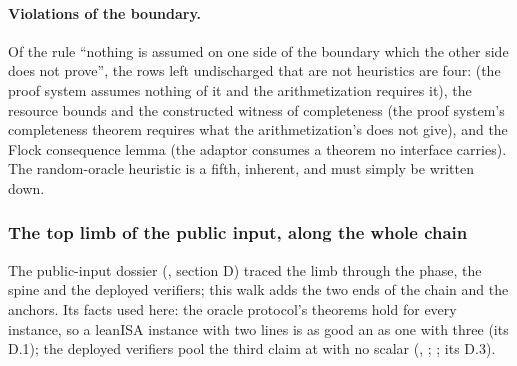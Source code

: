 \paragraph{Violations of the boundary.} Of the rule \enquote{nothing is assumed on one side of the
boundary which the other side does not prove}, the rows left undischarged that are not heuristics
are four:  (the proof system assumes nothing of it and the
arithmetization requires it), the resource bounds and the constructed witness of completeness
(the proof system's completeness theorem requires what the arithmetization's does not give), and
the Flock consequence lemma (the adaptor consumes a theorem no interface carries). The
random-oracle heuristic is a fifth, inherent, and must simply be written down.

\subsubsection{The top limb of the public input, along the whole chain}\label{sec:gen-boundary-toplimb}

The public-input dossier (, section D) traced the limb through the phase,
the spine and the deployed verifiers; this walk adds the two ends of the chain and the anchors.
Its facts used here: the oracle protocol's theorems hold for every instance, so a leanISA
instance with two lines is as good an  as one with three (its D.1); the deployed
verifiers pool the third claim at  with no scalar (,
 ; ; its D.3).


